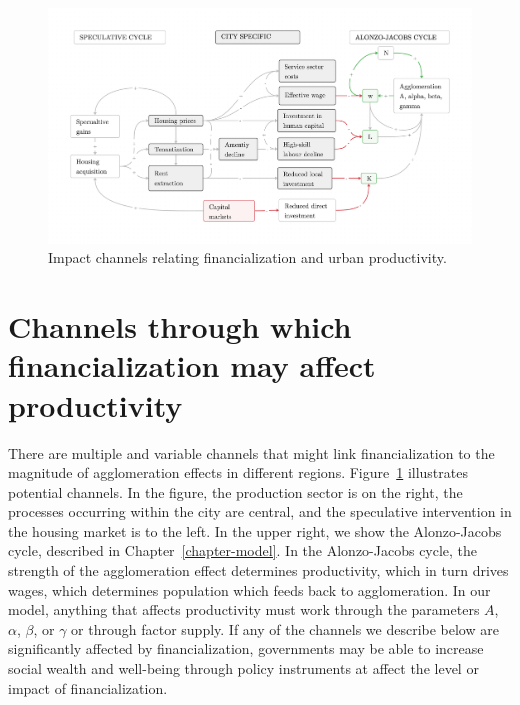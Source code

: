\begin{figure}[h!tb]
\begin{adjustwidth}{-0.24\textwidth}{-0.24\textwidth}
\centering
\includegraphics[scale=.15 ]{fig/impact-channels.png}%
\end{adjustwidth}
\caption[Impact channels relating financialization and urban productivity]{Impact channels relating financialization and urban productivity.} \label{fig-impact-channels}
\end{figure}


\section{Channels through which financialization may affect productivity}

There are multiple and variable channels that %
might link financialization to the magnitude of agglomeration effects in different regions. Figure~\ref{fig-impact-channels} illustrates potential channels. %
In the figure, the production sector is on the right, the processes occurring within the city are central, and the speculative intervention in the housing market is to the left. In the upper right, we show the \gls{Alonzo-Jacobs cycle}, described in Chapter~\ref{chapter-model}. In the Alonzo-Jacobs cycle, the strength of the agglomeration effect determines productivity, which in turn drives wages, which determines population which feeds back to agglomeration. In our model, anything that affects productivity must work through the parameters $A$, $\alpha$, $\beta$, or $\gamma$ or through factor supply. If any of the channels we describe below are significantly affected by financialization, governments may be able to increase social wealth and well-being through policy instruments at affect the level or impact of financialization. 

